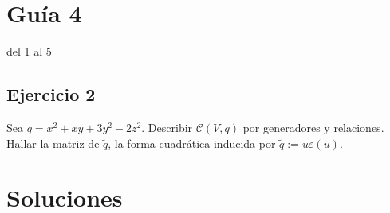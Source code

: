 \documentclass[12pt]{amsart}
\newcommand{\lp}{\left(}
\newcommand{\rp}{\right)}
\theoremstyle{plain}
\begin{document}
\section*{Guía 4}

del 1 al 5

\subsection*{Ejercicio 2} Sea $q=x^2+xy+3y^2-2z^2$. Describir 
$\mathcal{C}(V,q)$ por generadores y relaciones. Hallar la matriz 
de $\tilde{q}$, la forma cuadrática inducida por $\tilde{q}:=u
\varepsilon (u)$.




\newpage

\section*{Soluciones}






\end{document}
